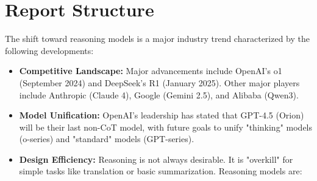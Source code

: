 \section{Report Structure}
\label{sec:intro-structure}


The shift toward reasoning models is a major industry trend characterized by the following developments:
\begin{itemize}
    \item \textbf{Competitive Landscape:} Major advancements include OpenAI’s o1 (September 2024) and DeepSeek’s R1 (January 2025). Other major players include Anthropic (Claude 4), Google (Gemini 2.5), and Alibaba (Qwen3).
    \item \textbf{Model Unification:} OpenAI’s leadership has stated that GPT-4.5 (Orion) will be their last non-CoT model, with future goals to unify "thinking" models (o-series) and "standard" models (GPT-series).
    \item \textbf{Design Efficiency:} Reasoning is not always desirable. It is "overkill" for simple tasks like translation or basic summarization. Reasoning models are:
\end{itemize}